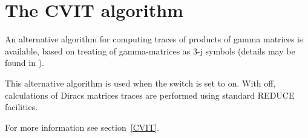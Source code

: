 \section{The CVIT algorithm}
\hypertarget{switch:CVIT}{}

An alternative algorithm for computing traces of products of gamma matrices is available,
based on treating of gamma-matrices as 3-j symbols (details may be found in
\cite{Ilyin:89,Kennedy:1982}).

This alternative algorithm is used when the switch  is set to on. With  off,
calculations of Diracs matrices traces are performed using standard REDUCE facilities.

For more information see section~\ref{CVIT}.
\endinput

